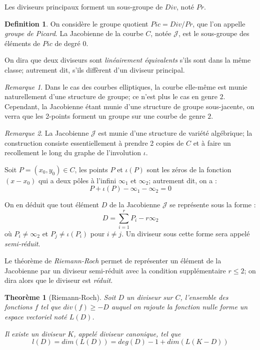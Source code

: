 \documentclass[a4paper]{article}
\newtheorem{theoreme}{Theorème}[section]
\theoremstyle{definition}
\newtheorem{definition}{Definition}[section]
\theoremstyle{remark}
\newtheorem{remarque}{Remarque}
\numberwithin{equation}{section}
\begin{document}
Les diviseurs principaux forment un sous-groupe de $Div$, noté $Pr$.
\begin{definition}
On considère le groupe quotient $Pic = Div/Pr$, que l'on appelle \emph{groupe de Picard}.
La Jacobienne de la courbe $C$, notée $\mathcal{J}$, est le sous-groupe des éléments de $Pic$ de degré 0.
\end{definition}

On dira que deux diviseurs sont \emph{linéairement équivalents} s'ils sont dans la même classe; autrement dit, s'ils diffèrent d'un diviseur principal.

\begin{remarque}
Dans le cas des courbes elliptiques, la courbe elle-même est munie naturellement d'une structure de groupe; ce n'est plus le cas en genre $2$. Cependant, la Jacobienne étant munie d'une structure de groupe sous-jacente, on verra que les 2-points forment un groupe sur une courbe de genre $2$.
\end{remarque}

\begin{remarque}
La Jacobienne $\mathcal{J}$ est munie d'une structure de variété algébrique; la construction \citep{cassels-Flynn} consiste essentiellement à prendre 2 copies de $C$ et à faire un recollement le long du graphe de l'involution $\iota$.
\end{remarque}

Soit $P=(x_0,y_0) \in C$, les points $P$ et $\iota(P)$ sont les zéros de la fonction $(x-x_0)$ qui a deux pôles à l'infini $\infty_1$ et $\infty_2$; autrement dit, on a :
$$P + \iota(P) - \infty_1 - \infty_2 = 0$$

On en déduit que tout élément $D$ de la Jacobienne $\mathcal{J}$ se représente sous la forme :
$$D = \sum_{i=1}^r{P_i} - r\infty_2$$
où $P_i \neq \infty_2$ et $P_j \neq \iota(P_i)$ pour $i \neq j$. Un diviseur sous cette forme sera appelé \emph{semi-réduit}.

Le théorème de \emph{Riemann-Roch} permet de représenter un élément de la Jacobienne par un diviseur semi-réduit avec la condition supplémentaire $r \leq 2$; on dira alors que le diviseur est \emph{réduit}.
\begin{theoreme}[Riemann-Roch]
Soit $D$ un diviseur sur $C$, l'ensemble des fonctions $f$ tel que $div(f) \geq -D$ auquel on rajoute la fonction nulle forme un espace vectoriel noté $L(D)$.

Il existe un diviseur $K$, appelé diviseur canonique, tel que
$$l(D) = dim (L(D)) = deg(D) - 1 + dim (L(K - D))$$
\end{theoreme}
\end{document}
